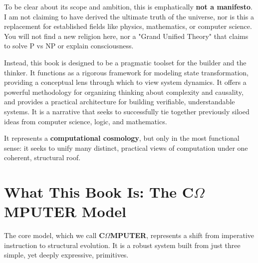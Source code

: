 To be clear about its scope and ambition, this is emphatically \textbf{not a manifesto}. I am not claiming to have derived the ultimate truth of the universe, nor is this a replacement for established fields like physics, mathematics, or computer science. You will not find a new religion here, nor a "Grand Unified Theory" that claims to solve P vs NP or explain consciousness.

Instead, this book is designed to be a pragmatic toolset for the builder and the thinker. It functions as a rigorous framework for modeling state transformation, providing a conceptual lens through which to view system dynamics. It offers a powerful methodology for organizing thinking about complexity and causality, and provides a practical architecture for building verifiable, understandable systems. It is a narrative that seeks to successfully tie together previously siloed ideas from computer science, logic, and mathematics.

It represents a \textbf{computational cosmology}, but only in the most functional sense: it seeks to unify many distinct, practical views of computation under one coherent, structural roof.

\section{What This Book Is: The C\texorpdfstring{\boldmath$\Omega$}{Omega}MPUTER Model}
\label{sec:what-is}

The core model, which we call \textbf{C\texorpdfstring{\boldmath$\Omega$}{Omega}MPUTER}, represents a shift from imperative instruction to structural evolution. It is a robust system built from just three simple, yet deeply expressive, primitives.



